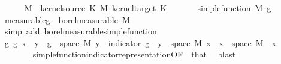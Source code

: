 \begin{isabellebody}
\ \ \ \ \isamarkupfalse%
\ {\isacharquery}{\kern0pt}M\ {\isacharequal}{\kern0pt}\ {\isachardoublequoteopen}{\isacharparenleft}{\kern0pt}kernel{\isacharunderscore}{\kern0pt}source\ K\ {\isasymOtimes}\isactrlsub M\ kernel{\isacharunderscore}{\kern0pt}target\ K{\isacharparenright}{\kern0pt}{\isachardoublequoteclose}\isanewline
\ \ \ \ \isamarkupfalse%
\ {\isacharasterisk}{\kern0pt}{\isacharcolon}{\kern0pt}\ {\isachardoublequoteopen}simple{\isacharunderscore}{\kern0pt}function\ {\isacharquery}{\kern0pt}M\ g{\isachardoublequoteclose}\isanewline
\ \ \ \ \isamarkupfalse%
\ \isamarkupfalse%
\ {\isacharbrackleft}{\kern0pt}measurable{\isacharbrackright}{\kern0pt}{\isacharcolon}{\kern0pt}{\isachardoublequoteopen}g\ {\isasymin}\ borel{\isacharunderscore}{\kern0pt}measurable\ {\isacharquery}{\kern0pt}M{\isachardoublequoteclose}\isanewline
\ \ \ \ \ \ \isamarkupfalse%
\ {\isacharparenleft}{\kern0pt}simp\ add{\isacharcolon}{\kern0pt}\ borel{\isacharunderscore}{\kern0pt}measurable{\isacharunderscore}{\kern0pt}simple{\isacharunderscore}{\kern0pt}function{\isacharparenright}{\kern0pt}\isanewline
\ \ \ \ \isamarkupfalse%
\ g{\isacharcolon}{\kern0pt}\ {\isachardoublequoteopen}g\ x\ {\isacharequal}{\kern0pt}\ {\isacharparenleft}{\kern0pt}{\isasymSum}y\ {\isasymin}\ g\ {\isacharbackquote}{\kern0pt}\ space\ {\isacharquery}{\kern0pt}M{\isachardot}{\kern0pt}\ y\ {\isacharasterisk}{\kern0pt}\ indicator\ {\isacharparenleft}{\kern0pt}g\ {\isacharminus}{\kern0pt}{\isacharbackquote}{\kern0pt}\ {\isacharbraceleft}{\kern0pt}y{\isacharbraceright}{\kern0pt}\ {\isasyminter}\ space\ {\isacharquery}{\kern0pt}M{\isacharparenright}{\kern0pt}\ x{\isacharparenright}{\kern0pt}{\isachardoublequoteclose}\ \ {\isachardoublequoteopen}x\ {\isasymin}\ space\ {\isacharquery}{\kern0pt}M{\isachardoublequoteclose}\ \ x\isanewline
\ \ \ \ \ \ \isamarkupfalse%
\ simple{\isacharunderscore}{\kern0pt}function{\isacharunderscore}{\kern0pt}indicator{\isacharunderscore}{\kern0pt}representation{\isacharbrackleft}{\kern0pt}OF\ {\isacharasterisk}{\kern0pt}\ that{\isacharbrackright}{\kern0pt}\ \isamarkupfalse%
\ blast\isanewline
\ \ \ \ \isacommand{{\isacharbraceleft}{\kern0pt}}\isamarkupfalse%
\isanewline
\ \ \ \ \ \ \isamarkupfalse%
\ {\isasymomega}\ \isamarkupfalse%
\ {\isacharasterisk}{\kern0pt}{\isacharcolon}{\kern0pt}\ {\isachardoublequoteopen}{\isasymomega}\ {\isasymin}\ {\isacharquery}{\kern0pt}{\isasymOmega}\isanewline

\end{isabellebody}
